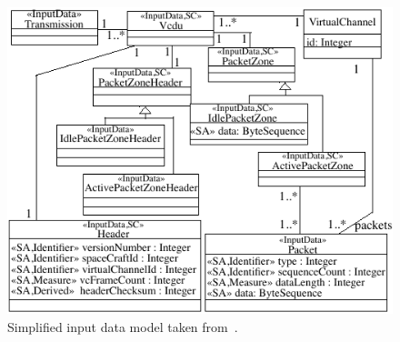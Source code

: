 \begin{figure}[t!]
  \centering
    \includegraphics{images/classDiagramSmall}
      \caption{Simplified input data model taken from~\cite{di2015evolutionary}.}
      \label{fig:dataModel}
\end{figure}

